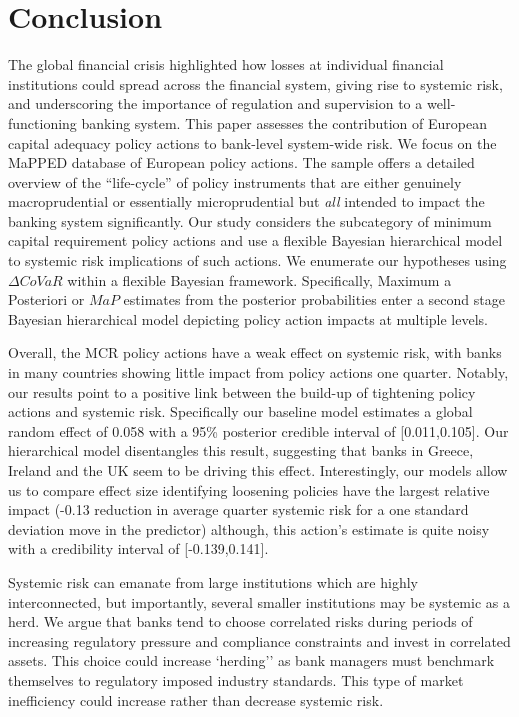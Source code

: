 \documentclass[
  10pt,
]{article}
\begin{document}
\hypertarget{conclusion}{%
\section{Conclusion}\label{conclusion}}

The global financial crisis highlighted how losses at individual
financial institutions could spread across the financial system, giving
rise to systemic risk, and underscoring the importance of regulation and
supervision to a well-functioning banking system. This paper assesses
the contribution of European capital adequacy policy actions to
bank-level system-wide risk. We focus on the MaPPED database of European
policy actions. The sample offers a detailed overview of the
``life-cycle'' of policy instruments that are either genuinely
macroprudential or essentially microprudential but \emph{all} intended
to impact the banking system significantly. Our study considers the
subcategory of minimum capital requirement policy actions and use a
flexible Bayesian hierarchical model to systemic risk implications of
such actions. We enumerate our hypotheses using \(\Delta CoVaR\) within
a flexible Bayesian framework. Specifically, Maximum a Posteriori or
\(MaP\) estimates from the posterior probabilities enter a second stage
Bayesian hierarchical model depicting policy action impacts at multiple
levels.

Overall, the MCR policy actions have a weak effect on systemic risk,
with banks in many countries showing little impact from policy actions
one quarter. Notably, our results point to a positive link between the
build-up of tightening policy actions and systemic risk. Specifically
our baseline model estimates a global random effect of 0.058 with a 95\%
posterior credible interval of {[}0.011,0.105{]}. Our hierarchical model
disentangles this result, suggesting that banks in Greece, Ireland and
the UK seem to be driving this effect. Interestingly, our models allow
us to compare effect size identifying loosening policies have the
largest relative impact (-0.13 reduction in average quarter systemic
risk for a one standard deviation move in the predictor) although, this
action's estimate is quite noisy with a credibility interval of
{[}-0.139,0.141{]}.

Systemic risk can emanate from large institutions which are highly
interconnected, but importantly, several smaller institutions may be
systemic as a herd. We argue that banks tend to choose correlated risks
during periods of increasing regulatory pressure and compliance
constraints and invest in correlated assets. This choice could increase
`herding'' as bank managers must benchmark themselves to regulatory
imposed industry standards. This type of market inefficiency could
increase rather than decrease systemic risk.
\end{document}
